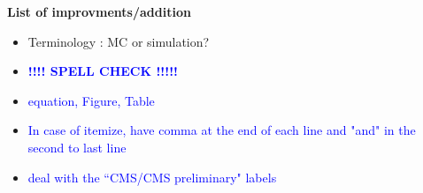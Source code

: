 
\begin{center}
\LARGE \textbf{List of improvments/addition}  \\
\end{center}
\vspace{1cm}

\normalsize
\begin{itemize}









\item 
Terminology : MC or simulation?

\item 
\textcolor{blue}{\textbf{!!!! SPELL CHECK !!!!!}} 
\item 
\textcolor{blue}{equation, Figure, Table}
\item 
\textcolor{blue}{In case of itemize, have comma at the end of each line 
                 and "and" in the second to last line} 
\item 
\textcolor{blue}{deal with the ``CMS/CMS preliminary" labels} 


\end{itemize}
